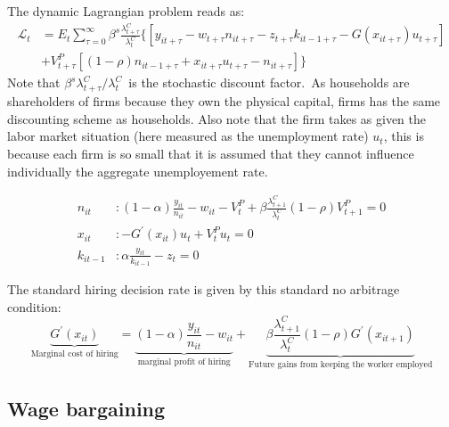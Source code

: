 \documentclass[a4paper,12pt]{article}%
\begin{document}
The dynamic Lagrangian problem reads as:%
\begin{align*}
\mathcal{L}_{t}  &  =E_{t}%
{\textstyle\sum_{\tau=0}^{\infty}}
\beta^{s}\frac{\lambda_{t+\tau}^{C}}{\lambda_{t}^{C}}\{\left[  y_{it+\tau
}-w_{t+\tau}n_{it+\tau}-z_{t+\tau}k_{it-1+\tau}-G\left(  x_{it+\tau}\right)
u_{t+\tau}\right] \\
&  +V_{t+\tau}^{P}\left[  \left(  1-\rho\right)  n_{it-1+\tau}+x_{it+\tau
}u_{t+\tau}-n_{it+\tau}\right]  \}
\end{align*}
Note that $\beta^{s}\lambda_{t+\tau}^{C}/\lambda_{t}^{C}$\ is the stochastic
discount factor.\ As households are shareholders of firms because they own the
physical capital, firms has the same discounting scheme as households. Also
note that the firm takes as given the labor market situation (here measured as
the unemployment rate) $u_{t}$, this is because each firm is so small that it
is assumed that they cannot influence individually the aggregate unemployement rate.%

\begin{align*}
n_{it}  &  :(1-\alpha)\frac{y_{it}}{n_{it}}-w_{it}-V_{t}^{P}+\beta
\frac{\lambda_{t+1}^{C}}{\lambda_{t}^{C}}\left(  1-\rho\right)  V_{t+1}%
^{P}=0\\
x_{it}  &  :-G^{\prime}\left(  x_{it}\right)  u_{t}+V_{t}^{P}u_{t}=0\\
k_{it-1}  &  :\alpha\frac{y_{it}}{k_{it-1}}-z_{t}=0
\end{align*}


The standard hiring decision rate is given by this standard no arbitrage
condition:%
\[
\underset{\text{Marginal cost of hiring}}{\underbrace{G^{\prime}\left(
x_{it}\right)  }}=\underset{\text{marginal profit of hiring}}{\underbrace
{(1-\alpha)\frac{y_{it}}{n_{it}}-w_{it}}}+\underset{\text{Future gains from
keeping the worker employed}}{\underbrace{\beta\frac{\lambda_{t+1}^{C}%
}{\lambda_{t}^{C}}\left(  1-\rho\right)  G^{\prime}\left(  x_{it+1}\right)  }}%
\]


\subsection{Wage bargaining}
\end{document}
